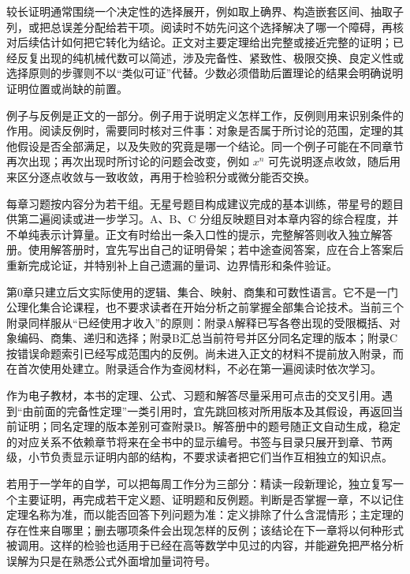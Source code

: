 较长证明通常围绕一个决定性的选择展开，例如取上确界、构造嵌套区间、抽取子列，或把总误差分配给若干项。阅读时不妨先问这个选择解决了哪一个障碍，再核对后续估计如何把它转化为结论。正文对主要定理给出完整或接近完整的证明；已经反复出现的纯机械代数可以简述，涉及完备性、紧致性、极限交换、良定义性或选择原则的步骤则不以“类似可证”代替。少数必须借助后置理论的结果会明确说明证明位置或尚缺的前置。

例子与反例是正文的一部分。例子用于说明定义怎样工作，反例则用来识别条件的作用。阅读反例时，需要同时核对三件事：对象是否属于所讨论的范围，定理的其他假设是否全部满足，以及失败的究竟是哪一个结论。同一个例子可能在不同章节再次出现；再次出现时所讨论的问题会改变，例如 \(x^n\) 可先说明逐点收敛，随后用来区分逐点收敛与一致收敛，再用于检验积分或微分能否交换。

每章习题按内容分为若干组。无星号题目构成建议完成的基本训练，带星号的题目供第二遍阅读或进一步学习。A、B、C 分组反映题目对本章内容的综合程度，并不单纯表示计算量。正文有时给出一条入口性的提示，完整解答则收入独立解答册。使用解答册时，宜先写出自己的证明骨架；若中途查阅答案，应在合上答案后重新完成论证，并特别补上自己遗漏的量词、边界情形和条件验证。

第0章只建立后文实际使用的逻辑、集合、映射、商集和可数性语言。它不是一门公理化集合论课程，也不要求读者在开始分析之前掌握全部集合论技术。当前三个附录同样服从“已经使用才收入”的原则：附录A解释已写各卷出现的受限概括、对象编码、商集、递归和选择；附录B汇总当前符号并区分同名定理的版本；附录C按错误命题索引已经写成范围内的反例。尚未进入正文的材料不提前放入附录，而在首次使用处建立。附录适合作为查阅材料，不必在第一遍阅读时依次学习。

作为电子教材，本书的定理、公式、习题和解答尽量采用可点击的交叉引用。遇到“由前面的完备性定理”一类引用时，宜先跳回核对所用版本及其假设，再返回当前证明；同名定理的版本差别可查附录B。解答册中的题号随正文自动生成，稳定的对应关系不依赖章节将来在全书中的显示编号。书签与目录只展开到章、节两级，小节负责显示证明内部的结构，不要求读者把它们当作互相独立的知识点。

若用于一学年的自学，可以把每周工作分为三部分：精读一段新理论，独立复写一个主要证明，再完成若干定义题、证明题和反例题。判断是否掌握一章，不以记住定理名称为准，而以能否回答下列问题为准：定义排除了什么含混情形；主定理的存在性来自哪里；删去哪项条件会出现怎样的反例；该结论在下一章将以何种形式被调用。这样的检验也适用于已经在高等数学中见过的内容，并能避免把严格分析误解为只是在熟悉公式外面增加量词符号。
